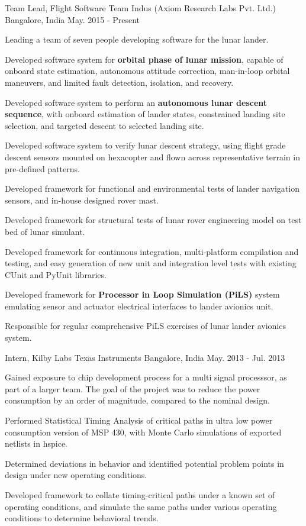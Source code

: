 \begin{cventries}
	\cventry
	{Team Lead, Flight Software}
	{Team Indus (Axiom Research Labs Pvt. Ltd.)}
	{Bangalore, India}
	{May. 2015 - Present}
	{
		\begin{cvitems}
			\item{Leading a team of seven people developing software for the lunar lander.}
			\item{Developed software system for \textbf{orbital phase of lunar mission}, capable of onboard state estimation, autonomous attitude correction, man-in-loop orbital maneuvers, and limited fault detection, isolation, and recovery.}
			\item{Developed software system to perform an \textbf{autonomous lunar descent sequence}, with onboard estimation of lander states, constrained landing site selection, and targeted descent to selected landing site.}
			\item{Developed software system to verify lunar descent strategy, using flight grade descent sensors mounted on hexacopter and flown across representative terrain in pre-defined patterns.}
			\item{Developed framework for functional and environmental tests of lander navigation sensors, and in-house designed rover mast.}
			\item{Developed framework for structural tests of lunar rover engineering model on test bed of lunar simulant.}
			\item{Developed framework for continuous integration, multi-platform compilation and testing, and easy generation of new unit and integration level tests with existing CUnit and PyUnit libraries.}
			\item{Developed framework for \textbf{Processor in Loop Simulation (PiLS)} system emulating sensor and actuator electrical interfaces to lander avionics unit.}
			\item{Responsible for regular comprehensive PiLS exercises of lunar lander avionics system.}
		\end{cvitems}
	}

	\cventry
	{Intern, Kilby Labs}
	{Texas Instruments}
	{Bangalore, India}
	{May. 2013 - Jul. 2013}
	{
		\begin{cvitems}
		\item{Gained exposure to chip development process for a multi signal processsor, as part of a larger team. The goal of the project was to reduce the power consumption by an order of magnitude, compared to the nominal design.}
		\item{Performed Statistical Timing Analysis of critical paths in ultra low power consumption version of MSP 430, with Monte Carlo simulations of exported netlists in hspice.}
		\item{Determined deviations in behavior and identified potential problem points in design under new operating conditions.}
		\item{Developed framework to collate timing-critical paths under a known set of operating conditions, and simulate the same paths under various operating conditions to determine behavioral trends.}
		\end{cvitems}
	}


\end{cventries}
